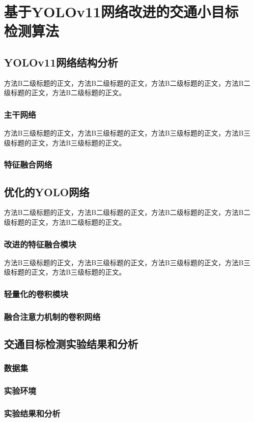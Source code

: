 \section{基于YOLOv11网络改进的交通小目标检测算法\label{方法B}}


\subsection{YOLOv11网络结构分析}

方法B二级标题的正文，方法B二级标题的正文，方法B二级标题的正文，方法B二级标题的正文，方法B二级标题的正文。

\subsubsection{主干网络}

方法B三级标题的正文，方法B三级标题的正文，方法B三级标题的正文，方法B三级标题的正文，方法B三级标题的正文。

\subsubsection{特征融合网络}


\subsection{优化的YOLO网络}

方法B二级标题的正文，方法B二级标题的正文，方法B二级标题的正文，方法B二级标题的正文，方法B二级标题的正文。

\subsubsection{改进的特征融合模块}

方法B三级标题的正文，方法B三级标题的正文，方法B三级标题的正文，方法B三级标题的正文，方法B三级标题的正文。

\subsubsection{轻量化的卷积模块}


\subsubsection{融合注意力机制的卷积网络}



\subsection{交通目标检测实验结果和分析}

\subsubsection{数据集}

\subsubsection{实验环境}

\subsubsection{实验结果和分析}
